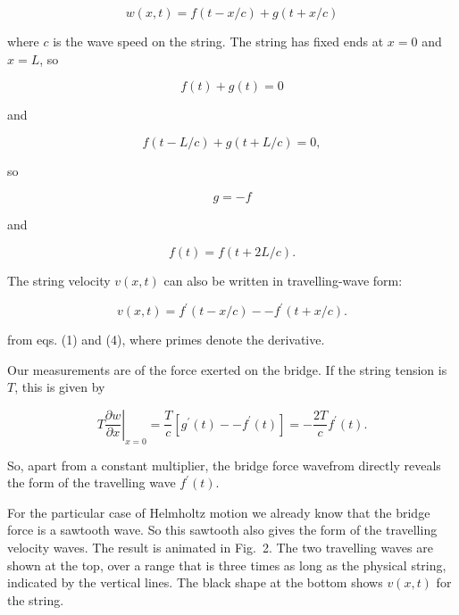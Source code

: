   \begin{equation*}w(x,t)=f(t-x/c)+g(t+x/c) \tag{1}\end{equation*} 

  \noindent{}where $c$ is the wave speed on the string. The string has fixed 
  ends at $x=0$ and $x=L$, so 

  \begin{equation*}f(t)+g(t)=0 \tag{2}\end{equation*} 

  \noindent{}and 

  \begin{equation*}f(t-L/c)+g(t+L/c)=0 , \tag{3}\end{equation*} 

  \noindent{}so 

  \begin{equation*}g=-f \tag{4}\end{equation*} 

  \noindent{}and 

  \begin{equation*}f(t)=f(t+2L/c) . \tag{5}\end{equation*} 

  The string velocity $v(x,t)$ can also be written in travelling-wave form: 

  \begin{equation*}v(x,t)=f^\prime(t-x/c) -- f^\prime(t+x/c) . 
  \tag{6}\end{equation*} 

  \noindent{}from eqs. (1) and (4), where primes denote the derivative. 

  Our measurements are of the force exerted on the bridge. If the string 
  tension is $T$, this is given by 

  \begin{equation*}T \left.\dfrac{\partial w}{\partial x} \right|_{x=0} = 
  \dfrac{T}{c} \left[ g^\prime(t) -- f^\prime(t) 
  \right]=-\dfrac{2T}{c}f^\prime(t) . \tag{7}\end{equation*} 

  So, apart from a constant multiplier, the bridge force wavefrom directly 
  reveals the form of the travelling wave $f^\prime(t)$. 

  For the particular case of Helmholtz motion we already know that the bridge 
  force is a sawtooth wave. So this sawtooth also gives the form of the 
  travelling velocity waves. The result is animated in Fig.\ 2. The two 
  travelling waves are shown at the top, over a range that is three times as 
  long as the physical string, indicated by the vertical lines. The black shape 
  at the bottom shows $v(x,t)$ for the string. 

